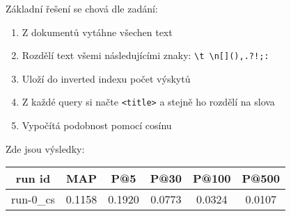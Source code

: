 \documentclass[10pt]{article}
\begin{document}
Základní řešení se chová dle zadání:

\begin{enumerate}
    \item Z dokumentů vytáhne všechen text
    \item Rozdělí text všemi následujícími znaky: \verb|\t \n[](),.?!;:|
    \item Uloží do inverted indexu počet výskytů
    \item Z každé query si načte \verb|<title>| a stejně ho rozdělí na slova
    \item Vypočítá podobnost pomocí cosínu
\end{enumerate}

Zde jsou výsledky:

\begin{center}
\begin{tabular}{c c c c c c} 
    run id & MAP & P@5 & P@30 & P@100 & P@500 \\ [0.5ex]
 \hline
    run-0\_cs & 0.1158 & 0.1920 & 0.0773 & 0.0324 & 0.0107\\
 \hline
\end{tabular}
\end{center}
\end{document}
